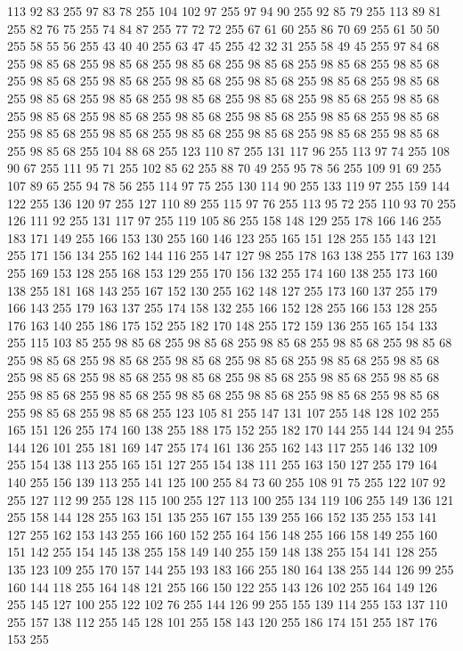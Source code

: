 113 92 83 255 97 83 78 255 104 102 97 255 97 94 90 255 92 85 79 255 113 89 81 255 82 76 75 255 74 84 87 255 77 72 72 255 67 61 60 255 86 70 69 255 61 50 50 255 58 55 56 255 43 40 40 255 63 47 45 255 42 32 31 255 58 49 45 255 97 84 68 255 98 85 68 255 98 85 68 255 98 85 68 255 98 85 68 255 98 85 68 255 98 85 68 255 98 85 68 255 98 85 68 255 98 85 68 255 98 85 68 255 98 85 68 255 98 85 68 255 98 85 68 255 98 85 68 255 98 85 68 255 98 85 68 255 98 85 68 255 98 85 68 255 98 85 68 255 98 85 68 255 98 85 68 255 98 85 68 255 98 85 68 255 98 85 68 255 98 85 68 255 98 85 68 255 98 85 68 255 98 85 68 255 98 85 68 255 98 85 68 255 98 85 68 255 104 88 68 255 123 110 87 255 131 117 96 255 113 97 74 255 108 90 67 255 111 95 71 255 102 85 62 255 88 70 49 255 95 78 56 255 109 91 69 255 107 89 65 255 94 78 56 255 114 97 75 255 130 114 90 255 133 119 97 255
159 144 122 255 136 120 97 255 127 110 89 255 115 97 76 255 113 95 72 255 110 93 70 255 126 111 92 255 131 117 97 255 119 105 86 255 158 148 129 255 178 166 146 255 183 171 149 255 166 153 130 255 160 146 123 255 165 151 128 255 155 143 121 255 171 156 134 255 162 144 116 255 147 127 98 255 178 163 138 255 177 163 139 255 169 153 128 255 168 153 129 255 170 156 132 255 174 160 138 255 173 160 138 255 181 168 143 255 167 152 130 255 162 148 127 255 173 160 137 255 179 166 143 255 179 163 137 255 174 158 132 255 166 152 128 255 166 153 128 255 176 163 140 255 186 175 152 255 182 170 148 255 172 159 136 255 165 154 133 255 115 103 85 255 98 85 68 255 98 85 68 255 98 85 68 255 98 85 68 255 98 85 68 255 98 85 68 255 98 85 68 255 98 85 68 255 98 85 68 255 98 85 68 255 98 85 68 255 98 85 68 255 98 85 68 255 98 85 68 255 98 85 68 255 98 85 68 255 98 85 68 255 98 85 68 255 98 85 68 255 98 85 68 255 98 85 68 255 98 85 68 255 98 85 68 255
98 85 68 255 98 85 68 255 123 105 81 255 147 131 107 255 148 128 102 255 165 151 126 255 174 160 138 255 188 175 152 255 182 170 144 255 144 124 94 255 144 126 101 255 181 169 147 255 174 161 136 255 162 143 117 255 146 132 109 255 154 138 113 255 165 151 127 255 154 138 111 255 163 150 127 255 179 164 140 255 156 139 113 255 141 125 100 255 84 73 60 255 108 91 75 255 122 107 92 255 127 112 99 255 128 115 100 255 127 113 100 255 134 119 106 255 149 136 121 255 158 144 128 255 163 151 135 255 167 155 139 255 166 152 135 255 153 141 127 255 162 153 143 255 166 160 152 255 164 156 148 255 166 158 149 255 160 151 142 255 154 145 138 255 158 149 140 255 159 148 138 255 154 141 128 255 135 123 109 255 170 157 144 255 193 183 166 255 180 164 138 255 144 126 99 255 160 144 118 255 164 148 121 255 166 150 122 255 143 126 102 255 164 149 126 255 145 127 100 255 122 102 76 255 144 126 99 255 155 139 114 255 153 137 110 255 157 138 112 255 145 128 101 255 158 143 120 255 186 174 151 255 187 176 153 255
